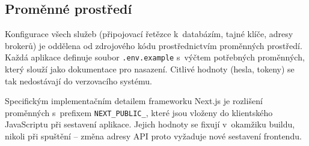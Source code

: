 \subsection{Proměnné prostředí}

Konfigurace všech služeb (připojovací řetězce k~databázím, tajné klíče, adresy brokerů) je oddělena od zdrojového kódu prostřednictvím proměnných prostředí. Každá aplikace definuje soubor \texttt{.env.example} s~výčtem potřebných proměnných, který slouží jako dokumentace pro nasazení. Citlivé hodnoty (hesla, tokeny) se tak nedostávají do verzovacího systému.

Specifickým implementačním detailem frameworku Next.js je rozlišení proměnných s~prefixem \texttt{NEXT\_PUBLIC\_}, které jsou vloženy do klientského JavaScriptu při sestavení aplikace. Jejich hodnoty se fixují v~okamžiku buildu, nikoli při spuštění -- změna adresy API proto vyžaduje nové sestavení frontendu.
